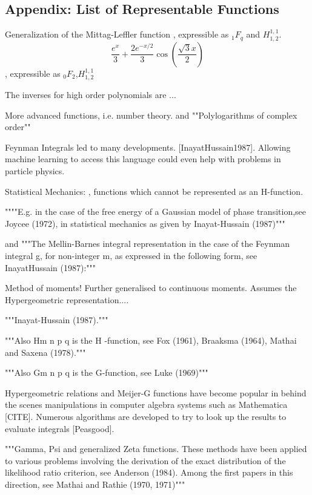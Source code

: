\documentclass[journal=jcisd8,manuscript=article,layout=onecolumn,pdftex,floatfix,amsmath,amssymb,10pt]{achemso}
\begin{document}
\subsection{Appendix: List of Representable Functions}
Generalization of the Mittag-Leffler function \citep{Rathie2017}, expressible as $_1F_q$ and $H^{1,1}_{1,2}$.
$$
\frac{e^x}{3} + \frac{2 e^{-x/2}}{3}\cos(\frac{\sqrt{3}x}{2})
$$ \citep{Rathie2017}, expressible as $_0F_2$,$H^{1,1}_{1,2}$


The inverses for high order polynomials are ...
\citep{Irwin2017}

More advanced functions, i.e. number theory.
and ""Polylogarithms of complex order"" \citep{Rathie1997}

Feynman Integrals led to many developments. [InayatHussain1987]. Allowing machine learning to access this language could even help with problems in particle physics.

Statistical Mechanics: \citep{Rathie1997}, functions which cannot be represented as an H-function. 

""""E.g. in the case of the free energy of
a Gaussian model of phase transition,see Joycee (1972), in statistical mechanics
as given by Inayat-Hussain (1987)""" \citep{Rathie1997} \citep{Inayat Hussain 1987}

and """The Mellin-Barnes integral representation in the case of the Feynman
integral g, for non-integer m, as expressed in the following form, see InayatHussain (1987):"""


Method of moments!
Further generalised to continuous moments. 
Assumes the Hypergeometric representation.... 


"""Inayat-Hussain
(1987)."""

"""Also Hm n
p q is the H -function, see Fox (1961), Braaksma (1964), Mathai and
Saxena (1978)."""

"""Also Gm n
p q is the G-function, see Luke (1969)"""


Hypergeometric relations and Meijer-G functions have become popular in behind the scenes manipulations in computer algebra systems such as Mathematica [CITE]. Numerous algorithms are developed to try to look up the results to evaluate integrals [Peasgood]. \citep{Rathie1997}

"""Gamma, Psi and generalized Zeta functions. These methods have been
applied to various problems involving the derivation of the exact distribution
of the likelihood ratio criterion, see Anderson (1984). Among the first papers
in this direction, see Mathai and Rathie (1970, 1971)""" \citep{Rathie1997}
\end{document}
